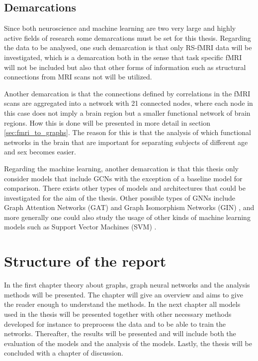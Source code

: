 \subsection{Demarcations}
Since both neuroscience and machine learning are two very large and highly active fields of research some demarcations must be set for this thesis. Regarding the data to be analysed, one such demarcation is that only RS-fMRI data will be investigated, which is a demarcation both in the sense that task specific fMRI will not be included but also that other forms of information such as structural connections from MRI scans not will be utilized. 

Another demarcation is that the connections defined by correlations in the fMRI scans are aggregated into a network with 21 connected nodes, where each node in this case does not imply a brain region but a smaller functional network of brain regions. How this is done will be presented in more detail in section \ref{sec:fmri_to_graphs}. The reason for this is that the analysis of which functional networks in the brain that are important for separating subjects of different age and sex becomes easier. 

Regarding the machine learning, another demarcation is that this thesis only consider models that include GCNs with the exception of a baseline model for comparison. There exists other types of models and architectures that could be investigated for the aim of the thesis. Other possible types of GNNs include Graph Attention Networks (GAT) \cite{gat} and Graph Isomorphism Networks (GIN) \cite{gin}, and more generally one could also  study the usage of other kinds of machine learning models such as Support Vector Machines (SVM) \cite{neuro_ml}.


\section{Structure of the report}
In the first chapter theory about graphs, graph neural networks and the analysis methods will be presented. The chapter will give an overview and aims to give the reader enough to understand the methods. In the next chapter all models used in the thesis will be presented together with other necessary methods developed for instance to preprocess the data and to be able to train the networks. Thereafter, the results will be presented and will include both the evaluation of the models and the analysis of the models. Lastly, the thesis will be concluded with a chapter of discussion. 

